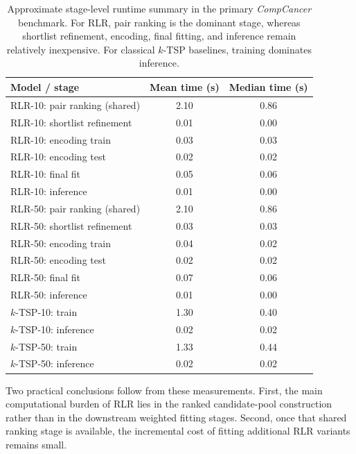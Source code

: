 \documentclass[11pt, a4paper]{article}
\newcommand{\stdtablefont}{\small}
\newcommand{\stdtablelayout}{%
  \stdtablefont
  \setlength{\tabcolsep}{4pt}
  \renewcommand{\arraystretch}{1.2}
}
\begin{document}
\begin{table}[!htbp]

\centering
\caption{Approximate stage-level runtime summary in the primary \emph{CompCancer} benchmark. For RLR, pair ranking is the dominant stage, whereas shortlist refinement, encoding, final fitting, and inference remain relatively inexpensive. For classical $k$-TSP baselines, training dominates inference.}
\label{tab:runtime_stage_summary}
{\stdtablelayout
\begin{tabular}{lcc}
\toprule
\textbf{Model / stage} & \textbf{Mean time (s)} & \textbf{Median time (s)} \\
\midrule
RLR-10: pair ranking (shared)   & 2.10 & 0.86 \\
RLR-10: shortlist refinement    & 0.01 & 0.00 \\
RLR-10: encoding train          & 0.03 & 0.03 \\
RLR-10: encoding test           & 0.02 & 0.02 \\
RLR-10: final fit               & 0.05 & 0.06 \\
RLR-10: inference               & 0.01 & 0.00 \\
\midrule
RLR-50: pair ranking (shared)   & 2.10 & 0.86 \\
RLR-50: shortlist refinement    & 0.03 & 0.03 \\
RLR-50: encoding train          & 0.04 & 0.02 \\
RLR-50: encoding test           & 0.02 & 0.02 \\
RLR-50: final fit               & 0.07 & 0.06 \\
RLR-50: inference               & 0.01 & 0.00 \\
\midrule
$k$-TSP-10: train               & 1.30 & 0.40 \\
$k$-TSP-10: inference           & 0.02 & 0.02 \\
$k$-TSP-50: train               & 1.33 & 0.44 \\
$k$-TSP-50: inference           & 0.02 & 0.02 \\
\bottomrule
\end{tabular}
}
\end{table}

Two practical conclusions follow from these measurements. First, the main computational burden of RLR lies in the ranked candidate-pool construction rather than in the downstream weighted fitting stages. Second, once that shared ranking stage is available, the incremental cost of fitting additional RLR variants remains small. 
\end{document}
